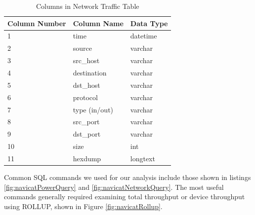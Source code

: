 \begin{table}[H]
    \centering
    \caption{Columns in Network Traffic Table}
    \begin{tabular}{@{}lll@{}}
    \toprule
    Column Number & Column Name & Data Type \\ \midrule
    1             & time        & datetime  \\
    2             & source      & varchar   \\
    3             & src\_host   & varchar   \\
    4             & destination & varchar   \\
    5             & dst\_host   & varchar   \\
    6             & protocol    & varchar   \\
    7             & type (in/out)       & varchar   \\
    8             & src\_port   & varchar   \\
    9             & dst\_port   & varchar   \\
    10            & size        & int       \\
    11            & hexdump     & longtext  \\ \bottomrule
    \end{tabular}
    \label{tab:netcol}
    \end{table}
Common SQL commands we used for our analysis include those shown in listings \ref{fig:navicatPowerQuery} and \ref{fig:navicatNetworkQuery}. The most useful commands generally required examining total throughput or device throughput using ROLLUP, shown in Figure \ref{fig:navicatRollup}.

